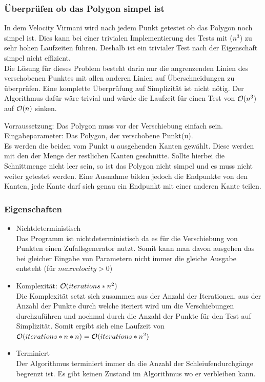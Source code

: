   \subsubsection{Überprüfen ob das Polygon simpel ist}
    In dem Velocity Virmani wird nach jedem Punkt getestet ob das Polygon 
    noch simpel ist. Dies kann bei einer trivialen Implementierung des 
    Tests mit \bigO($n^3$) zu sehr hohen Laufzeiten führen.
    Deshalb ist ein trivialer Test nach der Eigenschaft simpel nicht 
    effizient.\smallskip \\ 
    Die Lösung für dieses Problem besteht darin nur die angrenzenden 
    Linien des verschobenen Punktes mit allen anderen Linien auf 
    Überschneidungen zu überprüfen. Eine komplette Überprüfung auf 
    Simplizität ist nicht nötig.
    Der Algorithmus dafür wäre trivial und würde die Laufzeit für einen 
    Test von $\mathcal{O}(n^3)$ auf $\mathcal{O}(n)$ sinken.

    Vorraussetzung: Das Polygon muss vor der Verschiebung einfach sein.\\
    Eingabeparameter: Das Polygon, der verschobene Punkt(u).\\
    Es werden die beiden vom Punkt u ausgehenden Kanten gewählt. 
    Diese werden mit den der Menge der restlichen Kanten geschnitte.
    Sollte hierbei die Schnittmenge nicht leer sein,
    so ist das Polygon nicht simpel und es muss 
    nicht weiter getestet werden. Eine Ausnahme bilden jedoch die 
    Endpunkte von den Kanten, jede Kante darf sich genau ein Endpunkt mit 
    einer anderen Kante teilen.


  \subsubsection{Eigenschaften}
    \begin{itemize}
      \item Nichtdeterministisch\\
      Das Programm ist nichtdeterministisch da es für die Verschiebung 
      von Punkten einen Zufallsgenerator nutzt. Somit kann man davon 
      ausgehen das bei gleicher Eingabe von Parametern nicht immer die 
      gleiche Ausgabe entsteht (für $maxvelocity > 0$)
      \item Komplexität: $\mathcal{O}(iterations*n^2)$\\
      Die Komplexität setzt sich zusammen aus der Anzahl der 
      Iterationen, aus der Anzahl der Punkte durch welche iteriert wird 
      um die Verschiebungen durchzuführen und nochmal durch die Anzahl 
      der Punkte für den Test auf Simplizität. Somit ergibt sich eine 
      Laufzeit von $\mathcal{O}(iterations*n*n) = \mathcal{O}(iterations*n^2)$
      \item Terminiert\\
      Der Algorithmus terminiert immer da die Anzahl der 
      Schleiufendurchgänge begrenzt ist. Es gibt keinen Zustand im 
      Algorithmus wo er verbleiben kann.
    \end{itemize}


